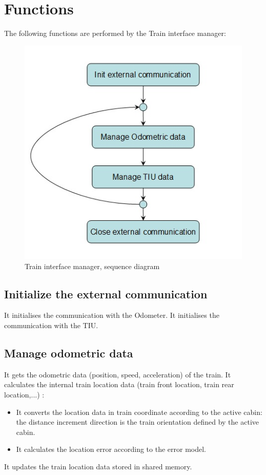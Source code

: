 \documentclass[nocc]{template/openetcs_report}
\begin{document}
\section{Functions}
The following functions are performed by the Train interface manager:
\begin{figure}[!h]
  \centering
  \includegraphics[width=\textwidth]{image/evc_train_interf_manager}
  \caption{Train interface manager, sequence diagram}
  \label{Train interface manager, sequence diagram}
\end{figure}

\subsection{Initialize the external communication}
It initialises the communication with the Odometer.
It initialises the communication with the TIU.
\subsection{Manage odometric data}
It gets the odometric data (position, speed, acceleration) of the train.
It calculates the internal train location data (train front location, train rear location,...) :
\begin{itemize}
	\item It converts the location data in train coordinate according to the active cabin: the distance increment direction is the train orientation defined by the active cabin.
	\item It calculates the location error according to the error model.
\end{itemize} 
It updates the train location data stored in shared memory.
\end{document}
